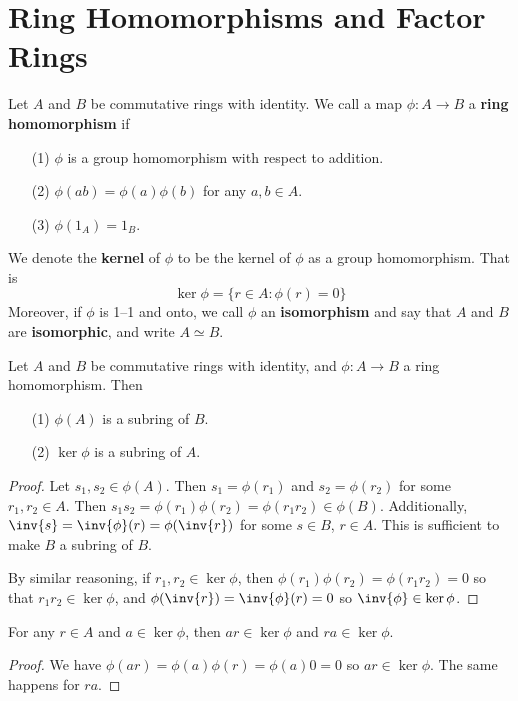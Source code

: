 \section{Ring Homomorphisms and Factor Rings}

\begin{definition}
    Let $A$ and  $B$ be commutative rings with identity. We call a map
    $\phi:A \xrightarrow{} B$ a \textbf{ring homomorphism} if
    \begin{enumerate}
        \item[(1)] $\phi$ is a group homomorphism with respect to addition.

        \item[(2)] $\phi(ab)=\phi(a)\phi(b)$ for any $a,b \in A$.

        \item[(3)] $\phi(1_A)=1_B$.
    \end{enumerate}
    We denote the \textbf{kernel} of $\phi$ to be the kernel of $\phi$ as a
    group homomorphism. That is
    \begin{equation*}
        \ker{\phi}=\{r \in A : \phi(r)=0\}
    \end{equation*}
    Moreover, if $\phi$ is 1--1 and onto, we call $\phi$ an \textbf{isomorphism}
    and say that $A$ and $B$ are \textbf{isomorphic}, and write $A \simeq B$.
\end{definition}

\begin{lemma}\label{1.3.1}
    Let $A$ and $B$ be commutative rings with identity, and $\phi:A \xrightarrow{}
    B$ a ring homomorphism. Then
    \begin{enumerate}
        \item[(1)] $\phi(A)$ is a subring of $B$.

        \item[(2)] $\ker{\phi}$ is a subring of $A$.
    \end{enumerate}
\end{lemma}
\begin{proof}
    Let $s_1,s_2 \in \phi(A)$. Then $s_1=\phi(r_1)$ and $s_2=\phi(r_2)$ for some
    $r_1,r_2 \in A$. Then $s_1s_2=\phi(r_1)\phi(r_2)=\phi(r_1r_2) \in \phi(B)$.
    Additionally, $\inv{s}=\inv{\phi}(r)=\phi(\inv{r})$ for some $s \in B$,  $r
    \in A$. This is sufficient to make  $B$ a subring of  $B$.

    By similar reasoning, if $r_1,r_2 \in \ker{\phi}$, then
    $\phi(r_1)\phi(r_2)=\phi(r_1r_2)=0$ so that $r_1r_2 \in \ker{\phi}$, and
    $\phi(\inv{r})=\inv{\phi}(r)=0$ so $\inv{\phi}\in \ker{\phi}$.
\end{proof}
\begin{corollary}
    For any $r \in A$ and  $a \in \ker{\phi}$, then $ar \in \ker{\phi}$ and $ra
    \in \ker{\phi}$.
\end{corollary}
\begin{proof}
    We have $\phi(ar)=\phi(a)\phi(r)=\phi(a)0=0$ so $ar \in \ker{\phi}$. The
    same happens for $ra$.
\end{proof}

